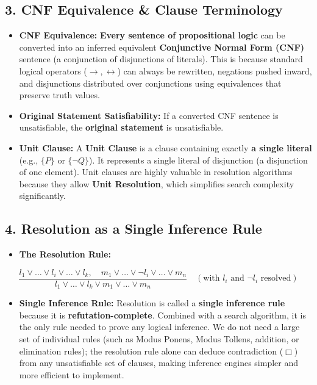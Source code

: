 \subsection{3. CNF Equivalence \& Clause Terminology}
\begin{itemize}
  \item   \textbf{CNF Equivalence:} \textbf{Every sentence of propositional logic} can be converted into an inferred equivalent \textbf{Conjunctive Normal Form (CNF)} sentence (a conjunction of disjunctions of literals). This is because standard logical operators ($\rightarrow, \leftrightarrow$) can always be rewritten, negations pushed inward, and disjunctions distributed over conjunctions using equivalences that preserve truth values.
  \item   \textbf{Original Statement Satisfiability:} If a converted CNF sentence is unsatisfiable, the \textbf{original statement} is unsatisfiable.
  \item   \textbf{Unit Clause:} A \textbf{Unit Clause} is a clause containing exactly \textbf{a single literal} (e.g., $\{P\}$ or $\{\neg Q\}$). It represents a single literal of disjunction (a disjunction of one element). Unit clauses are highly valuable in resolution algorithms because they allow \textbf{Unit Resolution}, which simplifies search complexity significantly.
\end{itemize}

\subsection{4. Resolution as a Single Inference Rule}
\begin{itemize}
  \item   \textbf{The Resolution Rule:}
\end{itemize}
    \[ \frac{l_1 \lor \dots \lor l_i \lor \dots \lor l_k, \quad m_1 \lor \dots \lor \neg l_i \lor \dots \lor m_n}{l_1 \lor \dots \lor l_k \lor m_1 \lor \dots \lor m_n} \quad (\text{with } l_i \text{ and } \neg l_i \text{ resolved}) \]
\begin{itemize}
  \item   \textbf{Single Inference Rule:} Resolution is called a \textbf{single inference rule} because it is \textbf{refutation-complete}. Combined with a search algorithm, it is the only rule needed to prove any logical inference. We do not need a large set of individual rules (such as Modus Ponens, Modus Tollens, addition, or elimination rules); the resolution rule alone can deduce contradiction ($\Box$) from any unsatisfiable set of clauses, making inference engines simpler and more efficient to implement.
\end{itemize}

